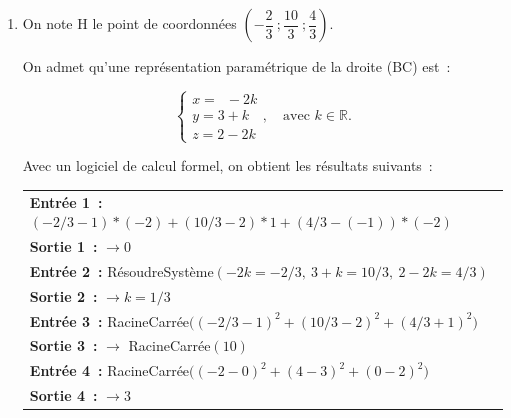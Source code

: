 \documentclass[10pt]{article}
\providecommand{\R}{\mathbb{R}}
\providecommand{\ds}{\displaystyle}
\begin{document}
\begin{enumerate}
\begin{enumerate}[label=\textbf{\alph*.}]
		\item La valeur exacte de la longueur DE, distance du point D au plan (ABC) est: 
		
$\begin{aligned}
\text{DE}
& =\ds\sqrt{\left (x_{\text E} - x_{\text D}\right )^2 + \left (y_{\text E} - y_{\text D}\right )^2 + \left (z_{\text E} - z_{\text D}\right )^2}
 =\ds\sqrt{\left (\frac{11}{2} - 8\right )^2 + \left (-2 - 2\right )^2 + \left (-\frac{21}{2} - (-11)\right )^2}\\
 & = \ds\sqrt{\left (-\frac{5}{2}\right )^2 + \left (-4\right )^2 + \left (\frac{1}{2}\right )^2}
 = \ds\sqrt{\frac{25}{4} + 16 + \frac{1}{4} }
  = \ds\sqrt{\frac{90}{4}}
  = \dfrac{3\sqrt{10}}{2}
\end{aligned}$		
		
		  
	\end{enumerate}
\item On note H le point de coordonnées $\left(-\dfrac{2}{3}~;\dfrac{10}{3}~;\dfrac{4}{3}\right)$.

On admet qu'une représentation paramétrique de la droite (BC) est~:

\[
\begin{cases}
x = \phantom{3}-2k\\
y = 3+k\\
z = 2-2k
\end{cases}, \quad \text{avec } k \in \R.
\]

Avec un logiciel de calcul formel, on obtient les résultats suivants~:

\begin{center}
\begin{tabular}{|p{8.5cm}|}\hline
\textbf{Entrée 1~:} $(-2/3-1)*(-2)+(10/3-2)*1+(4/3-(-1))*(-2)$\\
\textbf{Sortie 1~:} $\rightarrow 0$\\
\hline
\textbf{Entrée 2~:} RésoudreSystème$(-2k=-2/3,\ 3+k=10/3,\ 2-2k=4/3)$\\
\textbf{Sortie 2~:} $\rightarrow k = 1/3$\\
\hline
\textbf{Entrée 3~:} RacineCarrée$\big((-2/3-1)^2+(10/3-2)^2+(4/3+1)^2\big)$\\
\textbf{Sortie 3~:} $\rightarrow$ RacineCarrée$(10)$\\
\hline
\textbf{Entrée 4~:} RacineCarrée$\big((-2-0)^2+(4-3)^2+(0-2)^2\big)$\\
\textbf{Sortie 4~:} $\rightarrow 3$\\
\hline
\end{tabular}
\end{center}


\end{enumerate}
\end{document}
